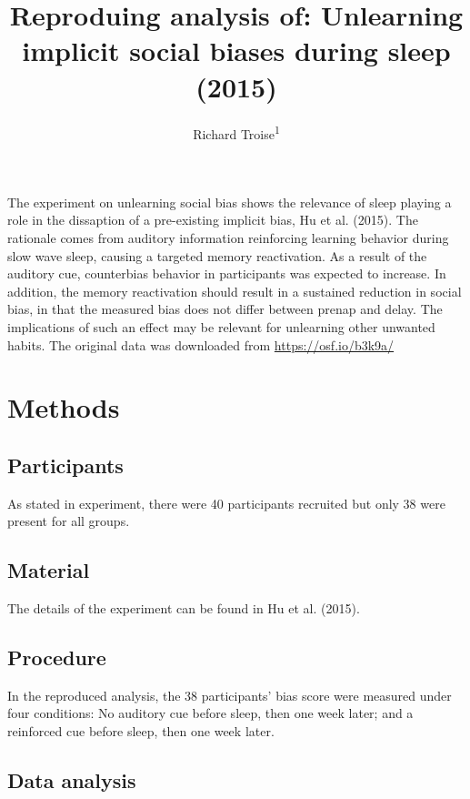 \documentclass[man,floatsintext]{apa6}
\title{Reproduing analysis of: Unlearning implicit social biases during sleep
(2015)}
\author{Richard Troise\textsuperscript{1}}
\date{}
\affiliation{
\vspace{0.5cm}
\textsuperscript{1} Brooklyn College}
\begin{document}
\maketitle

The experiment on unlearning social bias shows the relevance of sleep
playing a role in the dissaption of a pre-existing implicit bias, Hu et
al. (2015). The rationale comes from auditory information reinforcing
learning behavior during slow wave sleep, causing a targeted memory
reactivation. As a result of the auditory cue, counterbias behavior in
participants was expected to increase. In addition, the memory
reactivation should result in a sustained reduction in social bias, in
that the measured bias does not differ between prenap and delay. The
implications of such an effect may be relevant for unlearning other
unwanted habits. The original data was downloaded from
\href{https://osf.io/b7x8q/}{https://osf.io/b3k9a/}

\section{Methods}\label{methods}

\subsection{Participants}\label{participants}

As stated in experiment, there were 40 participants recruited but only
38 were present for all groups.

\subsection{Material}\label{material}

The details of the experiment can be found in Hu et al. (2015).

\subsection{Procedure}\label{procedure}

In the reproduced analysis, the 38 participants' bias score were
measured under four conditions: No auditory cue before sleep, then one
week later; and a reinforced cue before sleep, then one week later.

\subsection{Data analysis}\label{data-analysis}
\end{document}

